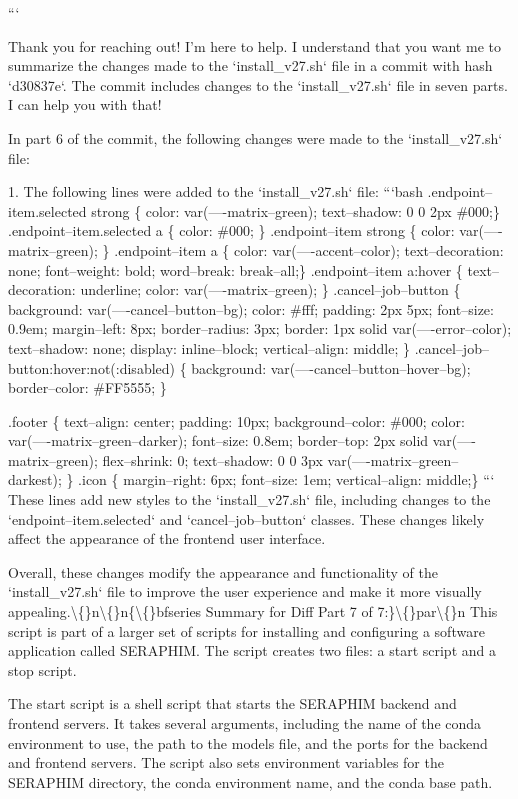 \documentclass{article}
\begin{document}
{```

Thank you for reaching out! I'm here to help. I understand that you want me to summarize the changes made to the `install\_v27.sh` file in a commit with hash `d30837e`. The commit includes changes to the `install\_v27.sh` file in seven parts. I can help you with that!

In part 6 of the commit, the following changes were made to the `install\_v27.sh` file:

1. The following lines were added to the `install\_v27.sh` file:
```bash
.endpoint--item.selected strong \{ color: var(----matrix--green); text--shadow: 0 0 2px \#000;\} 
.endpoint--item.selected a \{ color: \#000; \}
.endpoint--item strong \{ color: var(----matrix--green); \}
.endpoint--item a \{ color: var(----accent--color); text--decoration: none; font--weight: bold; word--break: break--all;\}
.endpoint--item a:hover \{ text--decoration: underline; color: var(----matrix--green); \}
.cancel--job--button \{
    background: var(----cancel--button--bg); color: \#fff;
    padding: 2px 5px; font--size: 0.9em; 
    margin--left: 8px; 
    border--radius: 3px;
    border: 1px solid var(----error--color); text--shadow: none;
    display: inline--block; 
    vertical--align: middle; 
\}
.cancel--job--button:hover:not(:disabled) \{ background: var(----cancel--button--hover--bg); border--color: \#FF5555; \}

.footer \{ text--align: center; padding: 10px; background--color: \#000; color: var(----matrix--green--darker); font--size: 0.8em; border--top: 2px solid var(----matrix--green); flex--shrink: 0; text--shadow: 0 0 3px var(----matrix--green--darkest); \}
.icon \{ margin--right: 6px; font--size: 1em; vertical--align: middle;\}
```
These lines add new styles to the `install\_v27.sh` file, including changes to the `endpoint--item.selected` and `cancel--job--button` classes. These changes likely affect the appearance of the frontend user interface.

Overall, these changes modify the appearance and functionality of the `install\_v27.sh` file to improve the user experience and make it more visually appealing.\textbackslash\{\}n\textbackslash\{\}n\{\textbackslash\{\}bfseries Summary for Diff Part 7 of 7:\}\textbackslash\{\}par\textbackslash\{\}n  This script is part of a larger set of scripts for installing and configuring a software application called SERAPHIM. The script creates two files: a start script and a stop script.

The start script is a shell script that starts the SERAPHIM backend and frontend servers. It takes several arguments, including the name of the conda environment to use, the path to the models file, and the ports for the backend and frontend servers. The script also sets environment variables for the SERAPHIM directory, the conda environment name, and the conda base path.

}
\end{document}

